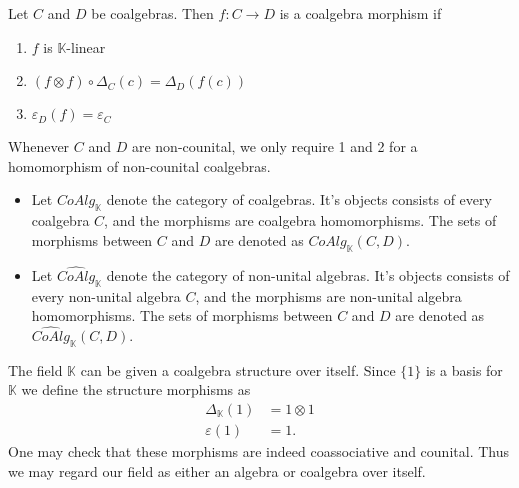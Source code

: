 \documentclass[../thesis.tex]{subfiles}
\begin{document}
            \begin{definition}
                Let $C$ and $D$ be coalgebras. Then $f:C\rightarrow D$ is a coalgebra morphism if
                \begin{enumerate}
                    \item $f$ is $\mathbb{K}$-linear
                    \item $(f\otimes f)\circ\Delta_C(c) = \Delta_D(f(c))$
                    \item $\varepsilon_D(f) = \varepsilon_C$
                \end{enumerate}
                Whenever $C$ and $D$ are non-counital, we only require 1 and 2 for a homomorphism of non-counital coalgebras.
            \end{definition}

            \begin{definition}
                \begin{itemize}
                    \item Let $CoAlg_{\mathbb{K}}$ denote the category of coalgebras. It's objects consists of every coalgebra $C$, and the morphisms are coalgebra homomorphisms. The sets of morphisms between $C$ and $D$ are denoted as $CoAlg_{\mathbb{K}}(C,D)$.
                    \item Let $\widehat{CoAlg}_{\mathbb{K}}$ denote the category of non-unital algebras. It's objects consists of every non-unital algebra $C$, and the morphisms are non-unital algebra homomorphisms. The sets of morphisms between $C$ and $D$ are denoted as $\widehat{CoAlg}_{\mathbb{K}}(C,D)$.
                \end{itemize}
            \end{definition}

            \begin{example}
                The field $\mathbb{K}$ can be given a coalgebra structure over itself. Since $\{1\}$ is a basis for $\mathbb{K}$ we define the structure morphisms as
                \begin{align*}
                    \Delta_{\mathbb{K}}(1) & = 1\otimes 1 \\
                    \varepsilon(1) & = 1.
                \end{align*}
                One may check that these morphisms are indeed coassociative and counital. Thus we may regard our field as either an algebra or coalgebra over itself.
            \end{example}
\end{document}
